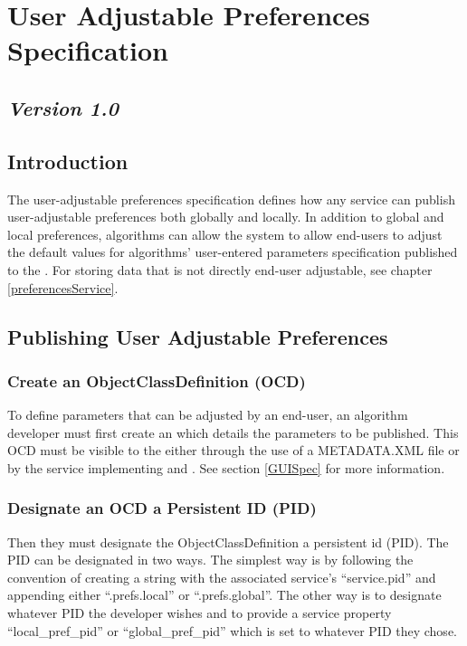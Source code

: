 \section{User Adjustable Preferences Specification}
\label{userPrefsSpec}
\subsection*{\textit{Version 1.0}}
\subsection{Introduction}

The user-adjustable preferences specification defines how any service can publish
user-adjustable preferences both globally and locally. In addition to global and
local preferences, algorithms can allow the system to allow end-users to adjust
the default values for algorithms' user-entered parameters specification
published to the . For storing data that is not directly
end-user adjustable, see chapter \ref{preferencesService}.

\subsection{Publishing User Adjustable Preferences}

\subsubsection*{Create an ObjectClassDefinition (OCD)} To define parameters that
can be adjusted by an end-user, an algorithm developer must first create an
 which details the parameters to be published. This
OCD must be visible to the  either through the use of a
METADATA.XML file or by the service implementing  and
. See section \ref{GUISpec} for more information.

\subsubsection*{Designate an OCD a Persistent ID (PID)} Then they must designate
the ObjectClassDefinition a persistent id (PID). The PID can be designated in two
ways. The simplest way is by following the convention of creating a string with
the associated service's ``service.pid'' and appending either ``.prefs.local'' or
``.prefs.global''. The other way is to designate whatever PID the developer
wishes and to provide a service property ``local\_pref\_pid'' or
``global\_pref\_pid'' which is set to whatever PID they chose.

